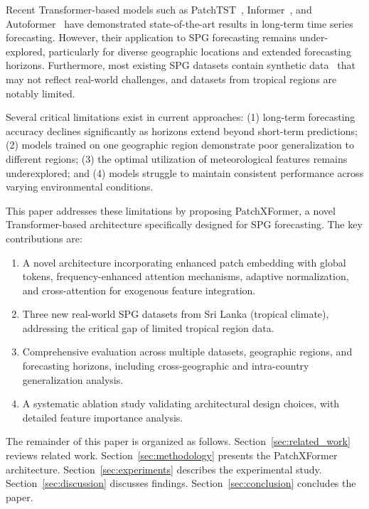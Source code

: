 \documentclass[a4paper,fleqn]{cas-dc}
\begin{document}
Recent Transformer-based models such as PatchTST~\cite{nie2022patchtst}, Informer~\cite{zhou2021informer}, and Autoformer~\cite{wu2021autoformer} have demonstrated state-of-the-art results in long-term time series forecasting. However, their application to SPG forecasting remains under-explored, particularly for diverse geographic locations and extended forecasting horizons. Furthermore, most existing SPG datasets contain synthetic data~\cite{ECMWF,GFS,SoDa,SARAH} that may not reflect real-world challenges, and datasets from tropical regions are notably limited.

Several critical limitations exist in current approaches: (1) long-term forecasting accuracy declines significantly as horizons extend beyond short-term predictions; (2) models trained on one geographic region demonstrate poor generalization to different regions; (3) the optimal utilization of meteorological features remains underexplored; and (4) models struggle to maintain consistent performance across varying environmental conditions.

This paper addresses these limitations by proposing PatchXFormer, a novel Transformer-based architecture specifically designed for SPG forecasting. The key contributions are:

\begin{enumerate}
    \item A novel architecture incorporating enhanced patch embedding with global tokens, frequency-enhanced attention mechanisms, adaptive normalization, and cross-attention for exogenous feature integration.
    
    \item Three new real-world SPG datasets from Sri Lanka (tropical climate), addressing the critical gap of limited tropical region data.
    
    \item Comprehensive evaluation across multiple datasets, geographic regions, and forecasting horizons, including cross-geographic and intra-country generalization analysis.
    
    \item A systematic ablation study validating architectural design choices, with detailed feature importance analysis.
\end{enumerate}

The remainder of this paper is organized as follows. Section~\ref{sec:related_work} reviews related work. Section~\ref{sec:methodology} presents the PatchXFormer architecture. Section~\ref{sec:experiments} describes the experimental study. Section~\ref{sec:discussion} discusses findings. Section~\ref{sec:conclusion} concludes the paper.
\end{document}
